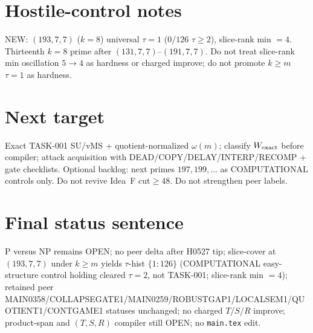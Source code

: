 \documentclass[11pt]{article}
\begin{document}
\section*{Hostile-control notes}
NEW: $(193,7,7)$ ($k{=}8$) universal $\tau{=}1$ ($0/126$ $\tau{\ge}2$), slice-rank min $=4$.
Thirteenth $k{=}8$ prime after $(131,7,7)$--$(191,7,7)$.
Do not treat slice-rank min oscillation $5\to4$ as hardness or charged improve;
do not promote $k{\ge}m$ $\tau{=}1$ as hardness.

\section*{Next target}
Exact TASK-001 SU/vMS + quotient-normalized $\omega(m)$; classify $W_{\rm exact}$ before compiler;
attack acquisition with DEAD/COPY/DELAY/INTERP/RECOMP + gate checklists.
Optional backlog: next primes $197,199,\ldots$ as COMPUTATIONAL controls only.
Do not revive Idea~F cut$\ge48$. Do not strengthen peer labels.

\section*{Final status sentence}
P versus NP remains OPEN; no peer delta after H0527 tip; slice-cover at $(193,7,7)$ under $k{\ge}m$ yields $\tau$-hist $\{1{:}126\}$ (COMPUTATIONAL easy-structure control holding cleared $\tau{=}2$, not TASK-001; slice-rank min $=4$); retained peer MAIN0358/COLLAPSEGATE1/MAIN0259/ROBUSTGAP1/LOCALSEM1/QUOTIENT1/CONTGAME1 statuses unchanged; no charged $T$/$S$/$R$ improve; product-span and $(T,S,R)$ compiler still OPEN; no \texttt{main.tex} edit.
\end{document}
